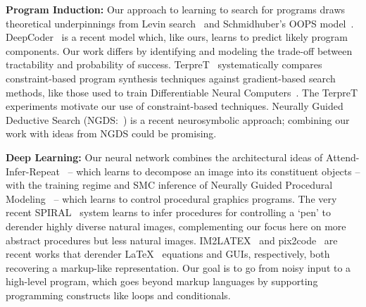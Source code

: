 \documentclass{article}
\theoremstyle{definition}
\begin{document}
\textbf{Program Induction:}
Our approach to learning to search for programs draws theoretical
underpinnings from Levin
search~\citep{levin1973universal,solomonoff1984optimum} and
Schmidhuber's OOPS model~\citep{schmidhuber2004optimal}.
DeepCoder~\citep{BalGauBroetal16} is a recent model which, like ours, learns to predict likely program components.
Our work differs by identifying and modeling
the trade-off between tractability and probability of success.
TerpreT~\citep{gaunt2016terpret} 
systematically compares constraint-based program synthesis techniques
against gradient-based search methods, like those used to train
Differentiable Neural Computers~\citep{graves2016hybrid}.  The TerpreT
experiments motivate our use of constraint-based techniques.
Neurally Guided Deductive Search (NGDS:~\cite{ngds})
is a recent neurosymbolic approach;
combining our work with ideas from NGDS could be promising.




\textbf{Deep Learning:} Our neural network combines the architectural ideas of Attend-Infer-Repeat~\citep{eslami1603attend} -- which learns to decompose an image into its constituent objects -- with the training regime and SMC inference  of Neurally Guided Procedural Modeling~\cite{ritchie2016neurally} -- which learns to control procedural graphics programs.
The very recent SPIRAL~\cite{ganin2018synthesizing}  system
learns to infer
procedures for controlling a `pen' to derender highly diverse natural images,
complementing our focus here on more abstract
procedures but less natural images.
IM2LATEX~\citep{im2latex} and pix2code~\cite{DBLP:journals/corr/Beltramelli17} are recent works that 
 derender  \LaTeX~ equations and GUIs, respectively,
both recovering a markup-like representation.
Our goal is to go from
noisy input to a high-level program,
which goes beyond markup languages by supporting
programming constructs like loops and conditionals.
\end{document}
